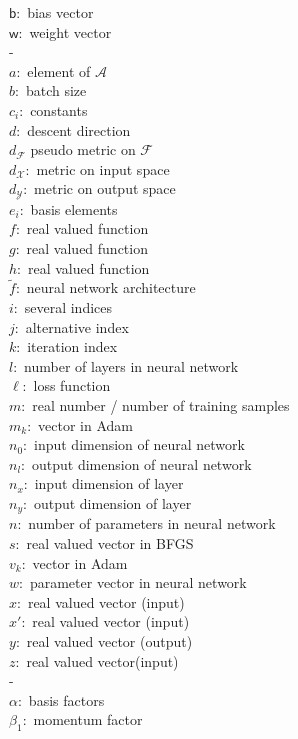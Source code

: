 \documentclass[11pt, a4paper]{article}
\newcommand{\A}{\mathcal{A}}
\newcommand{\F}{\mathcal{F}}
\newcommand{\X}{\mathcal{X}}
\newcommand{\Y}{\mathcal{Y}}
\renewcommand{\b}{\mathsf{b}}
\newcommand{\w}{\mathsf{w}}
\begin{document}
\pagebreak
$\b:$ bias vector \\
$\w:$ weight vector \\
- \\
$a:$ element of $\A$ \\
$b:$ batch size \\
$c_i:$ constants \\
$d:$ descent direction \\
$d_{\F}$ pseudo metric on $\F$ \\
$d_{\X}:$ metric on input space \\
$d_{\Y}:$ metric on output space \\
$e_i:$ basis elements \\
$f:$ real valued function \\
$g:$ real valued function \\
$h:$ real valued function \\
$\tilde{f}:$ neural network architecture \\
$i:$ several indices \\
$j:$ alternative index \\
$k:$ iteration index \\
$l:$ number of layers in neural network \\
$\ell:$ loss function \\
$m:$ real number / number of training samples \\
$m_k:$ vector in Adam \\
$n_0:$ input dimension of neural network \\
$n_l:$ output dimension of neural network \\
$n_x:$ input dimension of layer \\
$n_y:$ output dimension of layer \\
$n:$ number of parameters in neural network \\
$s:$ real valued vector in BFGS \\
$v_k:$ vector in Adam \\
$w:$ parameter vector in neural network \\
$x:$ real valued vector (input) \\
$x':$ real valued vector (input) \\
$y:$ real valued vector (output) \\
$z:$ real valued vector(input) \\
- \\
$\alpha:$ basis factors \\
$\beta_1:$ momentum factor \\
\end{document}
